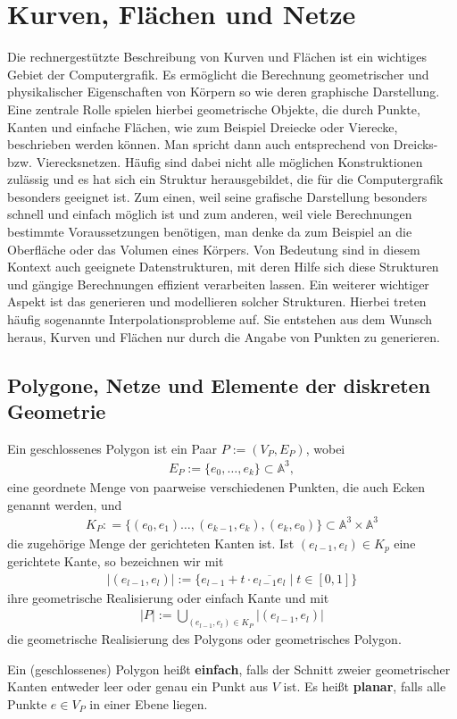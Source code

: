 \section{Kurven, Flächen und  Netze}
Die rechnergestützte Beschreibung von Kurven und Flächen ist ein wichtiges Gebiet der Computergrafik.
Es ermöglicht die Berechnung geometrischer und physikalischer  Eigenschaften von Körpern so wie deren graphische Darstellung.
Eine zentrale Rolle spielen hierbei geometrische Objekte, die durch Punkte, Kanten und einfache Flächen, wie zum Beispiel Dreiecke oder Vierecke, beschrieben werden können. Man spricht dann auch entsprechend von Dreicks- bzw. Vierecksnetzen. Häufig sind dabei nicht alle möglichen Konstruktionen zulässig und es hat sich ein Struktur herausgebildet, die für die Computergrafik besonders geeignet ist. Zum einen, weil seine grafische Darstellung besonders schnell und einfach möglich ist und zum anderen, weil viele Berechnungen bestimmte Voraussetzungen benötigen, man denke da zum Beispiel an die Oberfläche oder das Volumen eines Körpers.
Von Bedeutung sind in diesem Kontext auch geeignete Datenstrukturen, mit deren Hilfe sich diese Strukturen und gängige Berechnungen effizient verarbeiten lassen. 
Ein weiterer wichtiger Aspekt ist das generieren und modellieren solcher Strukturen. Hierbei treten häufig sogenannte Interpolationsprobleme auf. Sie entstehen aus dem Wunsch heraus, Kurven und Flächen nur durch die Angabe von Punkten zu generieren. 

\subsection{Polygone, Netze und Elemente der diskreten Geometrie}
\begin{Definition}
Ein geschlossenes Polygon ist ein Paar $P:=(V_P,E_P)$, wobei   
\begin{align*}
E_P := \{e_0, \hdots, e_k \} \subset \mathbb{A}^3,
\end{align*}
eine geordnete Menge von paarweise verschiedenen Punkten, die auch Ecken genannt werden, und   
\begin{align*}
K_P: = \biggl \{(e_0,e_1)  \hdots, (e_{k-1},e_k), (e_k,e_0) \biggr\} \subset \mathbb{A}^3 \times \mathbb{A}^3
\end{align*}
die zugehörige Menge der gerichteten Kanten ist. 
Ist $(e_{l-1},e_l) \in K_p$ eine gerichtete Kante, so bezeichnen wir mit 
\begin{align*}
|(e_{l-1},e_l)| := \bigl \{ e_{l-1} + t \cdot \overline{e_{l-1}e_{l}} \; \big  | \; t \in [0,1] \bigr \} 
\end{align*}
ihre geometrische Realisierung oder einfach Kante und mit 
\begin{align*}
|P|:= \bigcup_{(e_{l-1},e_l) \in K_P} |(e_{l-1},e_l)|
\end{align*}
 die geometrische Realisierung des Polygons oder geometrisches Polygon.


Ein (geschlossenes) Polygon heißt \textbf{einfach}, falls der Schnitt zweier geometrischer Kanten  entweder leer oder genau ein Punkt aus $V$ ist.
Es heißt \textbf{planar}, falls alle Punkte $e \in V_P$ in einer Ebene liegen.
\end{Definition}


